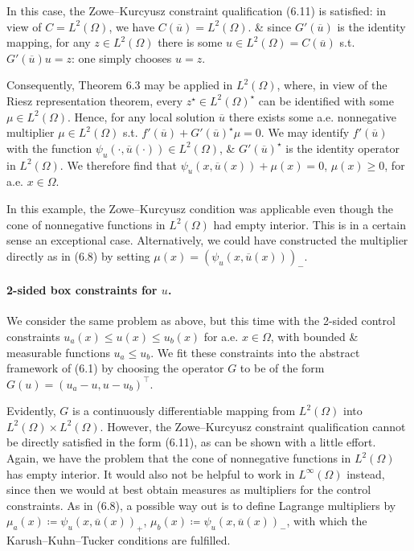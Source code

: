 \documentclass[oneside]{book}
\numberwithin{equation}{section}
\begin{document}
In this case, the Zowe--Kurcyusz constraint qualification (6.11) is satisfied: in view of $C = L^2(\Omega)$, we have $C(\overline{u}) = L^2(\Omega)$. \& since $G'(\overline{u})$ is the identity mapping, for any $z\in L^2(\Omega)$ there is some $u\in L^2(\Omega) = C(\overline{u})$ s.t. $G'(\overline{u})u = z$: one simply chooses $u = z$.

Consequently, Theorem 6.3 may be applied in $L^2(\Omega)$, where, in view of the Riesz representation theorem, every $z^\star\in L^2(\Omega)^\star$ can be identified with some $\mu\in L^2(\Omega)$. Hence, for any local solution $\overline{u}$ there exists some a.e. nonnegative multiplier $\mu\in L^2(\Omega)$ s.t. $f'(\overline{u}) + G'(\overline{u})^\star\mu = 0$. We may identify $f'(\overline{u})$ with the function $\psi_u(\cdot,\overline{u}(\cdot))\in L^2(\Omega)$, \& $G'(\overline{u})^\star$ is the identity operator in $L^2(\Omega)$. We therefore find that $\psi_u(x,\overline{u}(x)) + \mu(x) = 0$, $\mu(x)\ge 0$, for a.e. $x\in\Omega$.

In this example, the Zowe--Kurcyusz condition was applicable even though the cone of nonnegative functions in $L^2(\Omega)$ had empty interior. This is in a certain sense an exceptional case. Alternatively, we could have constructed the multiplier directly as in (6.8) by setting $\mu(x) = (\psi_u(x,\overline{u}(x)))_-$.

\paragraph{2-sided box constraints for $u$.} We consider the same problem as above, but this time with the 2-sided control constraints $u_a(x)\le u(x)\le u_b(x)$ for a.e. $x\in\Omega$, with bounded \& measurable functions $u_a\le u_b$. We fit these constraints into the abstract framework of (6.1) by choosing the operator $G$ to be of the form $G(u) = (u_a - u,u - u_b)^\top$.

Evidently, $G$ is a continuously differentiable mapping from $L^2(\Omega)$ into $L^2(\Omega)\times L^2(\Omega)$. However, the Zowe--Kurcyusz constraint qualification cannot be directly satisfied in the form (6.11), as can be shown with a little effort. Again, we have the problem that the cone of nonnegative functions in $L^2(\Omega)$ has empty interior. It would also not be helpful to work in $L^\infty(\Omega)$ instead, since then we would at best obtain measures as multipliers for the control constraints. As in (6.8), a possible way out is to define Lagrange multipliers by $\mu_a(x)\coloneqq\psi_u(x,\overline{u}(x))_+$, $\mu_b(x)\coloneqq\psi_u(x,\overline{u}(x))_-$, with which the Karush--Kuhn--Tucker conditions are fulfilled.
\end{document}
